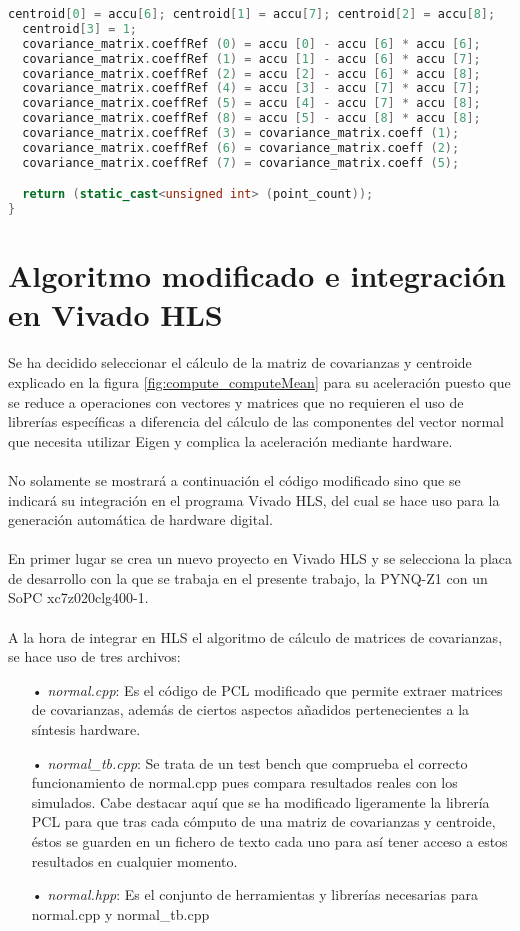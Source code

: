  \begin{lstlisting}[language=C++,breaklines]
  centroid[0] = accu[6]; centroid[1] = accu[7]; centroid[2] = accu[8];
  centroid[3] = 1;
  covariance_matrix.coeffRef (0) = accu [0] - accu [6] * accu [6];
  covariance_matrix.coeffRef (1) = accu [1] - accu [6] * accu [7];
  covariance_matrix.coeffRef (2) = accu [2] - accu [6] * accu [8];
  covariance_matrix.coeffRef (4) = accu [3] - accu [7] * accu [7];
  covariance_matrix.coeffRef (5) = accu [4] - accu [7] * accu [8];
  covariance_matrix.coeffRef (8) = accu [5] - accu [8] * accu [8];
  covariance_matrix.coeffRef (3) = covariance_matrix.coeff (1);
  covariance_matrix.coeffRef (6) = covariance_matrix.coeff (2);
  covariance_matrix.coeffRef (7) = covariance_matrix.coeff (5);

  return (static_cast<unsigned int> (point_count));
}
\end{lstlisting}



\section{Algoritmo modificado e integración en Vivado HLS}
Se ha decidido seleccionar el cálculo de la matriz de covarianzas y centroide explicado en la figura \ref{fig:compute_computeMean} para su aceleración puesto que se reduce a operaciones con vectores y matrices que no requieren el uso de librerías específicas a diferencia del cálculo de las componentes del vector normal que necesita utilizar Eigen y complica la aceleración mediante hardware.
\\
\\
No solamente se mostrará a continuación el código modificado sino que se indicará su integración en el programa Vivado HLS, del cual se hace uso para la generación automática de hardware digital.
\\
\\
En primer lugar se crea un nuevo proyecto en Vivado HLS y se selecciona la placa de desarrollo con la que se trabaja en el presente trabajo, la PYNQ-Z1 con un SoPC xc7z020clg400-1.
\\
\\
A la hora de integrar en HLS el algoritmo de cálculo de matrices de covarianzas, se hace uso de tres archivos:

\begin{itemize}
\item[•] \textit{normal.cpp}: Es el código de PCL modificado que permite extraer matrices de covarianzas, además de ciertos aspectos añadidos pertenecientes a la síntesis hardware.
\item[•] \textit{normal\_tb.cpp}: Se trata de un test bench que comprueba el correcto funcionamiento de normal.cpp pues compara resultados reales con los simulados. Cabe destacar aquí que se ha modificado ligeramente la librería PCL para que tras cada cómputo de una matriz de covarianzas y centroide, éstos se guarden en un fichero de texto cada uno para así tener acceso a estos resultados en cualquier momento.
\item[•] \textit{normal.hpp}: Es el conjunto de herramientas y librerías necesarias para normal.cpp y normal\_tb.cpp
\end{itemize}

